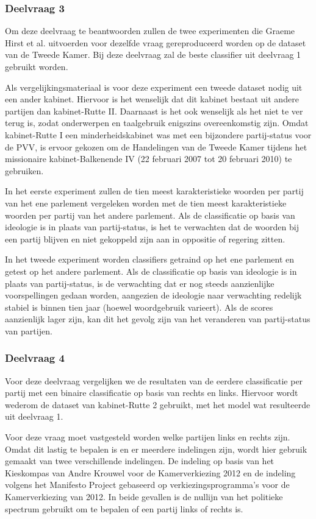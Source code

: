 \subsubsection{Deelvraag 3}

Om deze deelvraag te beantwoorden zullen de twee experimenten die Graeme Hirst et al. uitvoerden voor dezelfde vraag gereproduceerd worden op de dataset van de Tweede Kamer. Bij deze deelvraag zal de beste classifier uit deelvraag 1 gebruikt worden. \par
Als vergelijkingsmateriaal is voor deze experiment een tweede dataset nodig uit een ander kabinet. Hiervoor is het wenselijk dat dit kabinet bestaat uit andere partijen dan kabinet-Rutte II. Daarnaast is het ook wenselijk als het niet te ver terug is, zodat onderwerpen en taalgebruik enigszins overeenkomstig zijn. Omdat kabinet-Rutte I een minderheidskabinet was met een bijzondere partij-status voor de PVV, is ervoor gekozen om de Handelingen van de Tweede Kamer tijdens het missionaire kabinet-Balkenende IV (22 februari 2007 tot 20 februari 2010) te gebruiken.\par
In het eerste experiment zullen de tien meest karakteristieke woorden per partij van het ene parlement vergeleken worden met de tien meest karakteristieke woorden per partij van het andere parlement. Als de classificatie op basis van ideologie is in plaats van partij-status, is het te verwachten dat de woorden bij een partij blijven en niet gekoppeld zijn aan in oppositie of regering zitten. \par
In het tweede experiment worden classifiers getraind op het ene parlement en getest op het andere parlement. Als de classificatie op basis van ideologie is in plaats van partij-status, is de verwachting dat er nog steeds aanzienlijke voorspellingen gedaan worden, aangezien de ideologie naar verwachting redelijk stabiel is binnen tien jaar (hoewel woordgebruik varieert). Als de scores aanzienlijk lager zijn, kan dit het gevolg zijn van het veranderen van partij-status van partijen.\par

\subsubsection{Deelvraag 4}
Voor deze deelvraag vergelijken we de resultaten van de eerdere classificatie per partij met een binaire classificatie op basis van rechts en links. Hiervoor wordt wederom de dataset van kabinet-Rutte 2 gebruikt, met het model wat resulteerde uit deelvraag 1. \par
Voor deze vraag moet vastgesteld worden welke partijen links en rechts zijn. Omdat dit lastig te bepalen is en er meerdere indelingen zijn, wordt hier gebruik gemaakt van twee verschillende indelingen. De indeling op basis van het Kieskompas van Andre Krouwel voor de Kamerverkiezing 2012 en de indeling volgens het Manifesto Project\cite{Volkens:2017} gebaseerd op verkiezingsprogramma's voor de Kamerverkiezing van 2012. In beide gevallen is de nullijn van het politieke spectrum gebruikt om te bepalen of een partij links of rechts is.\par

